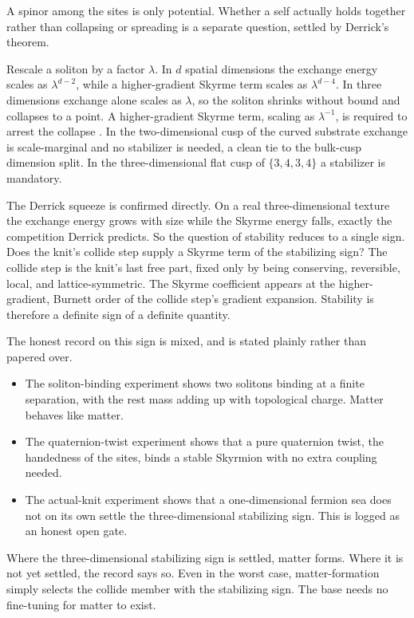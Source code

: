 A spinor among the sites is only potential. Whether a self actually holds together rather than collapsing or
spreading is a separate question, settled by Derrick's theorem.

Rescale a soliton by a factor $\lambda$. In $d$ spatial dimensions the exchange energy scales as $\lambda^{d-2}$,
while a higher-gradient Skyrme term scales as $\lambda^{d-4}$. In three dimensions exchange alone scales as
$\lambda$, so the soliton shrinks without bound and collapses to a point. A higher-gradient Skyrme term, scaling
as $\lambda^{-1}$, is required to arrest the collapse \cite{skyrme1962}. In the two-dimensional cusp of the
curved substrate exchange is scale-marginal and no stabilizer is needed, a clean tie to the bulk-cusp dimension
split. In the three-dimensional flat cusp of $\{3,4,3,4\}$ a stabilizer is mandatory.

The Derrick squeeze is confirmed directly. On a real three-dimensional texture the exchange energy grows with
size while the Skyrme energy falls, exactly the competition Derrick predicts. So the question of stability reduces
to a single sign. Does the knit's collide step supply a Skyrme term of the stabilizing sign? The collide step is
the knit's last free part, fixed only by being conserving, reversible, local, and lattice-symmetric. The Skyrme
coefficient appears at the higher-gradient, Burnett order of the collide step's gradient expansion. Stability is
therefore a definite sign of a definite quantity.

The honest record on this sign is mixed, and is stated plainly rather than papered over.

\begin{itemize}
\item The soliton-binding experiment shows two solitons binding at a finite separation, with the rest mass adding
up with topological charge. Matter behaves like matter.
\item The quaternion-twist experiment shows that a pure quaternion twist, the handedness of the sites, binds a
stable Skyrmion with no extra coupling needed.
\item The actual-knit experiment shows that a one-dimensional fermion sea does not on its own settle the
three-dimensional stabilizing sign. This is logged as an honest open gate.
\end{itemize}

\begin{result}
Where the three-dimensional stabilizing sign is settled, matter forms. Where it is not yet settled, the record
says so. Even in the worst case, matter-formation simply selects the collide member with the stabilizing sign.
The base needs no fine-tuning for matter to exist.
\end{result}

